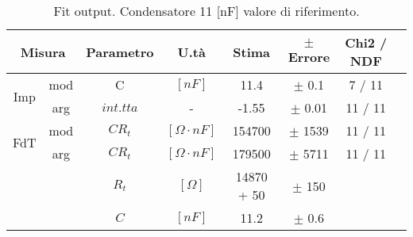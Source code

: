 \begin{table}[H]
\begin{center}
\begin{tabular}{|c|c|c|c|c|c|c|c|}
\hline

\multicolumn{2}{|c|}{Misura}  & Parametro   & U.tà & Stima & $\pm$ Errore & Chi2 / NDF     \\ \hline

\multirow{ 2}{*}{Imp}
& mod & C  & $[nF]$     
& 11.4 & $\pm$    0.1 &  7 / 11    \\

& arg & $int.tta$ & - 
& -1.55 & $\pm$ 0.01 &  11 / 11      \\ \hline


\multirow{ 2}{*}{FdT}
& mod & $CR_{t}$ & $[\Omega\cdot nF]$ & 154700  & $\pm$ 1539 & 11 / 11      \\ 
& arg & $CR_{t}$ & $[\Omega\cdot nF]$ & 179500  & $\pm$  5711 &  11 / 11      \\
\multicolumn{2}{|c|}{}  & $R_{t}$ & $[\Omega]$  
& 14870 + 50  & $\pm$  150 &       \\
\multicolumn{2}{|c|}{}  & $C$ & $[nF]$  
& 11.2  & $\pm$  0.6 &       \\ \hline

\end{tabular}

\label{C3_P1_fit_cond1}

\caption{
Fit output. Condensatore 11 [nF] valore di riferimento.
}

\end{center}

\end{table}

